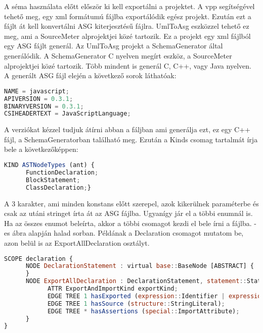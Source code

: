 A séma használata előtt először ki kell exportálni a projektet. A vpp segítségével tehető meg, egy xml formátumú fájlba exportálódik egész projekt.
Ezután ezt a fájlt át kell konvertálni ASG kiterjesztésű fájlra.
UmlToAsg eszközzel tehető ez meg, ami a SourceMeter alprojektjei közé tartozik.
Ez a projekt egy xml fájlból egy ASG fájlt generál.
Az UmlToAsg projekt a SchemaGenerator által generálódik.
A SchemaGenerator C nyelven megírt eszköz, a SourceMeter alprojektjei közé tartozik.
Több mindent is generál C, C++, vagy Java nyelven.
A generált ASG fájl elején a következő sorok láthatóak:

\begin{lstlisting}[caption={ASG fájl első sorai},label={lst:asg_file_eleje}, language={JavaScript}]
NAME = javascript;
APIVERSION = 0.3.1;
BINARYVERSION = 0.3.1;
CSIHEADERTEXT = JavaScriptLanguage;
\end{lstlisting}
\pagebreak

A verziókat kézzel tudjuk átírni abban a fáljban ami generálja ezt, ez egy C++ fájl, a SchemaGeneratorban található meg.
Ezután a Kinds csomag tartalmát írja bele a következőképpen:

\begin{lstlisting}[caption={A KIND típus átalakítása},label={lst:asg_file_kinds}, language={JavaScript}]
KIND ASTNodeTypes (ant) {
      FunctionDeclaration;
      BlockStatement;
      ClassDeclaration;}
\end{lstlisting}

A 3 karakter, ami minden konstans előtt szerepel, azok kikerülnek paraméterbe és csak az utáni stringet írta át az ASG fájlba.
Ugyanígy jár el a többi enumnál is.
Ha az összes enumot beleírta, akkor a többi csomagot kezdi el bele írni a fájlba. -es ábra alapján halad sorban.
Példának a Declaration csomagot mutatom be, azon belül is az ExportAllDeclaration osztályt.

\begin{lstlisting}[caption={ASG fájl ExportAllDeclaration},label={lst:asg_file_export_all_declaration}, language={JavaScript}]
SCOPE declaration {
      NODE DeclarationStatement : virtual base::BaseNode [ABSTRACT] {
      }
      NODE ExportAllDeclaration : DeclarationStatement, statement::Statement, virtual statement::ProgramStatement, special::Node {
            ATTR ExportAndImportKind exportKind;
            EDGE TREE 1 hasExported (expression::Identifier | expression::LiteralExpression);
            EDGE TREE 1 hasSource (structure::StringLiteral);
            EDGE TREE * hasAssertions (special::ImportAttribute);
      }
}
\end{lstlisting}


